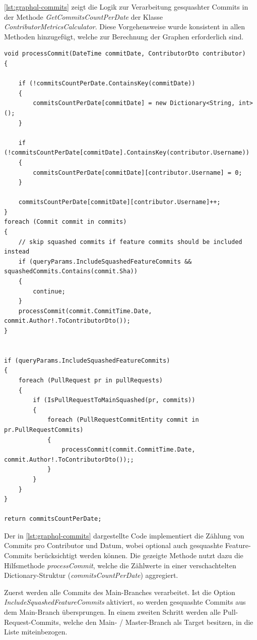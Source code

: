 \autoref{lst:graphql-commits} zeigt die Logik zur Verarbeitung gesquashter Commits in der Methode \textit{GetCommitsCountPerDate} der Klasse \textit{ContributorMetricsCalculator}. Diese Vorgehensweise wurde konsistent in allen Methoden hinzugefügt, welche zur Berechnung der Graphen erforderlich sind.

\begin{lstlisting}[language=CSharp, caption={Verarbeitung gesquashter Commits in der Methode \textit{GetCommitsCountPerDate}}, label={lst:graphql-commits}]
void processCommit(DateTime commitDate, ContributorDto contributor)
{

	if (!commitsCountPerDate.ContainsKey(commitDate))
	{
		commitsCountPerDate[commitDate] = new Dictionary<String, int>();
	}

	if (!commitsCountPerDate[commitDate].ContainsKey(contributor.Username))
	{
		commitsCountPerDate[commitDate][contributor.Username] = 0;
	}

	commitsCountPerDate[commitDate][contributor.Username]++;
}
foreach (Commit commit in commits)
{
	// skip squashed commits if feature commits should be included instead
	if (queryParams.IncludeSquashedFeatureCommits && squashedCommits.Contains(commit.Sha))
	{
		continue;
	}
	processCommit(commit.CommitTime.Date, commit.Author!.ToContributorDto());
}


if (queryParams.IncludeSquashedFeatureCommits)
{
	foreach (PullRequest pr in pullRequests)
	{
		if (IsPullRequestToMainSquashed(pr, commits))
		{
			foreach (PullRequestCommitEntity commit in pr.PullRequestCommits)
			{
				processCommit(commit.CommitTime.Date, commit.Author!.ToContributorDto());;		
			}	
		}
	}
}

return commitsCountPerDate;
\end{lstlisting}

Der in \autoref{lst:graphql-commits} dargestellte Code implementiert die Zählung von Commits pro Contributor und Datum, wobei optional auch gesquashte Feature-Commits berücksichtigt werden können. Die gezeigte Methode nutzt dazu die Hilfsmethode \textit{processCommit}, welche die Zählwerte in einer verschachtelten Dictionary-Struktur (\textit{commitsCountPerDate}) aggregiert.

Zuerst werden alle Commits des Main-Branches verarbeitet. Ist die Option \textit{IncludeSquashedFeatureCommits} aktiviert, so werden gesquashte Commits aus dem Main-Branch übersprungen. In einem zweiten Schritt werden alle Pull-Request-Commits, welche den Main- / Master-Branch als Target besitzen, in die Liste miteinbezogen. 

